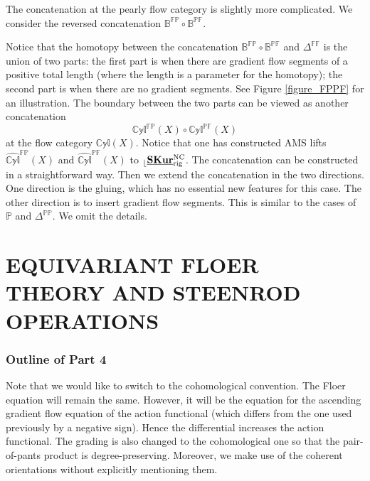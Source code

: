 \documentclass[reqno, 10pt]{amsart}
\numberwithin{equation}{section}
\numberwithin{equation}{section}
\theoremstyle{definition}
\theoremstyle{remark}
\newcommand{\beqn}{\begin{equation*}}
\newcommand{\eeqn}{\end{equation*}}
\newcommand{\mb}{\mathbb}
\renewcommand{\outer}{{}_{\lfloor}}
\newcommand{\wh}{\widehat}
\newcommand{\uds}[1]{\underline{\smash{#1}}}
\begin{document}
The concatenation at the pearly flow category is slightly more complicated. We consider the reversed concatenation ${\mb B}^{\mb{FP}} \circ \mb{B}^{\mb{PF}}$. 

Notice that the homotopy between the concatenation $\mb{B}^{\mb{FP}}\circ \mb{B}^{\mb{PF}}$ and $\mb{\Delta}^{\mb{FF}}$ is the union of two parts: the first part is when there are gradient flow segments of a positive total length (where the length is a parameter for the homotopy); the second part is when there are no gradient segments. See Figure \ref{figure_FPPF} for an illustration. The boundary between the two parts can be viewed as another concatenation
\beqn
\mb{Cyl}^{\mb{FP}}(X) \circ \mb{Cyl}^{\mb{PF}}(X)
\eeqn
at the flow category $\mb{Cyl}(X)$. Notice that one has constructed AMS lifts $\wh{\mb{Cyl}}^{\mb{FP}}(X)$ and $\wh{\mb{Cyl}}^{\mb{PF}}(X)$ to $\outer \uds{\bf SKur}_{\rm rig}^{\rm NC}$. The concatenation can be constructed in a straightforward way. Then we extend the concatenation in the two directions. One direction is the gluing, which has no essential new features for this case. The other direction is to insert gradient flow segments. This is similar to the cases of $\mb{P}$ and $\mb{\Delta}^{\mb{PP}}$. We omit the details.





















\newpage




\part{EQUIVARIANT FLOER THEORY AND STEENROD OPERATIONS}


\section*{Outline of Part 4}


Note that we would like to switch to the cohomological convention. The Floer equation will remain the same. However, it will be the equation for the ascending gradient flow equation of the action functional (which differs from the one used previously by a negative sign). Hence the differential increases the action functional. The grading is also changed to the cohomological one so that the pair-of-pants product is degree-preserving. Moreover, we make use of the coherent orientations without explicitly mentioning them.
\end{document}
